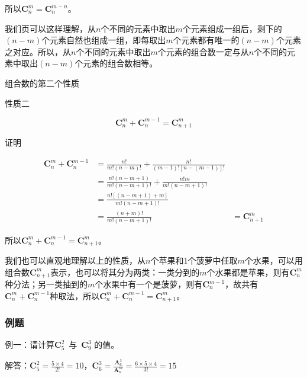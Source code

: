 所以$\textbf{C}_{n}^{m}=\textbf{C}_{n}^{m-n}$。

我们页可以这样理解，从$n$个不同的元素中取出$m$个元素组成一组后，剩下的$(n-m)$个元素自然也组成一组，即每取出$m$个元素都有唯一的$(n-m)$个元素之对应。所以，从$n$个不同的元素中取出$m$个元素的组合数一定与从$n$个不同的元素中取出$(n-m)$个元素的组合数相等。

组合数的第二个性质
\begin{flushleft}{\color{blue} 性质二}\end{flushleft}
\begin{equation}
    \textbf{C}_{n}^{m}+\textbf{C}_{n}^{m-1}=\textbf{C}_{n+1}^{m}
\end{equation}
\begin{flushleft}
	{\color{blue} 证明}
\end{flushleft}
\begin{equation*}
    \begin{aligned}
        \textbf{C}_{n}^{m}+\textbf{C}_{n}^{m-1} &= \frac{n!}{m!(n-m)!}+\frac{n!}{(m-1)![n-(m-1)]!} \\
        &= \frac{n!(n-m+1)}{m!(n-m+1)!}+\frac{n!m}{m!(n-m+1)!} \\
        &= \frac{n![(n-m+1)+m]}{m!(n-m+1)!} \\
        &= \frac{(n+m)!}{m!(n-m+1)!}
        &= \textbf{C}_{n+1}^{m}
    \end{aligned}
\end{equation*}

所以$\textbf{C}_{n}^{m}+\textbf{C}_{n}^{m-1}=\textbf{C}_{n+1}^{m}$。

我们也可以直观地理解以上的性质，从$n$个苹果和1个菠萝中任取$m$个水果，可以用组合数$\textbf{C}_{n+1}^{m}$表示，也可以将其分为两类：一类分到的$m$个水果都是苹果，则有$\textbf{C}_{n}^{m}$种分法；另一类抽到的$m$个水果中有一个是菠萝，则有$\textbf{C}_{n}^{m-1}$，故共有$\textbf{C}_{n}^{m}+\textbf{C}_{n}^{m-1}$种取法，所以$\textbf{C}_{n}^{m}+\textbf{C}_{n}^{m-1}=\textbf{C}_{n+1}^{m}$。

\subsubsection{例题}

{\color{blue} 例一：}{请计算$\textbf{C}_{5}^{2}$}~与~$\textbf{C}_{9}^{3}$ 的值。

{\color{blue} 解答：}$\textbf{C}_{5}^{2}=\frac{5\times{}4}{2!}=10$，$\textbf{C}_{6}^{3}=\frac{\textbf{A}_{6}^{3}}{\textbf{A}_{n}^{m}}=\frac{6\times{}5\times{}4}{3!} = 15$

